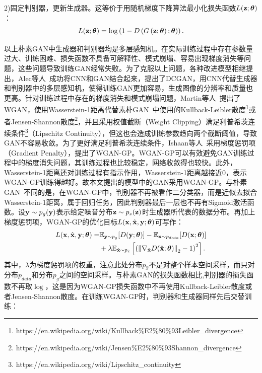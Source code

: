2)固定判别器，更新生成器。这等价于用随机梯度下降算法最小化损失函数$L(\mathbf{z};\mbox{\boldmath $\theta$})$：
	\begin{equation}
	L(\mathbf{z};\mbox{\boldmath $\theta$})=\log \left(1-D\left(G\left(\mathbf{z};\mbox{\boldmath $\theta$}\right);\mbox{\boldmath $\theta$}\right)\right).
	\end{equation}

\noindent 以上朴素GAN中生成器和判别器均是多层感知机。在实际训练过程中存在参数量过大、训练困难、损失函数不具备可解释性、模式崩塌、容易出现梯度消失等问题，这些问题导致训练GAN经常失败。为了克服以上问题，各种改进模型相继提出，Alec等人~\cite{radford2015unsupervised}成功将CNN和GAN结合起来，提出了DCGAN，用CNN代替生成器和判别器中的多层感知机，使得训练GAN更加容易，生成图像的分辨率和质量也更高。针对训练过程中存在的梯度消失和模式崩塌问题，Martin等人~\cite{arjovsky2017wasserstein}提出了WGAN，使用Wasserstein-1距离代替素朴GAN~\cite{goodfellow2014generative}中使用的Kullback-Leibler散度\footnote{https://en.wikipedia.org/wiki/Kullback\%E2\%80\%93Leibler\_divergence}或者Jensen-Shannon散度\footnote{https://en.wikipedia.org/wiki/Jensen\%E2\%80\%93Shannon\_divergence}，并且采用权值截断（Weight Clipping）满足利普希茨连续条件\footnote{https://en.wikipedia.org/wiki/Lipschitz\_continuity}（Lipschitz Continuity），但这也会造成训练参数趋向两个截断阈值，导致GAN不容易收敛。为了更好满足利普希茨连续条件，Ishaan等人~\cite{gulrajani2017improved}采用梯度惩罚项（Gradient Penalty），提出了WGAN-GP。WGAN-GP可以有效避免GAN训练过程中的梯度消失问题，其训练过程也比较稳定，网络收敛得也较快。此外，Wasserstein-1距离还对训练过程有指示作用，Wasserstein-1距离越接近0，表示WGAN-GP训练得越好。故本文提出的模型中的GAN采用WGAN-GP。与朴素GAN~\cite{goodfellow2014generative}不同的是，在WGAN-GP中，判别器不再被看作二分类器，而是近似去拟合Wasserstein-1距离，属于回归任务，因此判别器最后一层也不再有Sigmoid激活函数。设$\mathbf{y}\sim {p}_{g}(\mathbf{y})$表示给定噪音分布$\mathbf{z}\sim {p}_{{z}}(\mathbf{z})$时生成器所代表的数据分布。再加上梯度惩罚项，WGAN-GP的优化目标$L(\mathbf{x},\hat{\mathbf{x}},\mathbf{y};\mbox{\boldmath $\theta$})$可写作：
\begin{equation}\label{wgan_gp_loss_func}
  \begin{aligned}
	L(\mathbf{x},\hat{\mathbf{x}},\mathbf{y};\mbox{\boldmath $\theta$})=&\mathbb{E}_{\mathbf{y} \sim {p}_{{g}}}[D(\mathbf{y};\mbox{\boldmath $\theta$})]-\mathbb{E}_{\mathbf{x} \sim {p}_{{data}}}[D(\mathbf{x};\mbox{\boldmath $\theta$})] \\ &+\lambda \mathbb{E}_{\hat{\mathbf{x}} \sim {p}_{\hat{{x}}}}\left[\left(\left\|\nabla_{\hat{\mathbf{x}}}D(\hat{\mathbf{x}};\mbox{\boldmath $\theta$})\right\|_{2}-1\right)^{2}\right].
  \end{aligned}
\end{equation}
其中，$\lambda$为梯度惩罚项的权重，注意此处分布${p}_{\hat{{x}}}$不是对整个样本空间采样，而只对分布${p}_{{data}}$和分布${p}_{{g}}$之间的空间采样。与朴素GAN的损失函数相比,判别器的损失函数不再取$\log$，这是因为WGAN-GP损失函数中不再使用Kullback-Leibler散度或者Jensen-Shannon散度。在训练WGAN-GP时，判别器和生成器同样先后交替训练：

